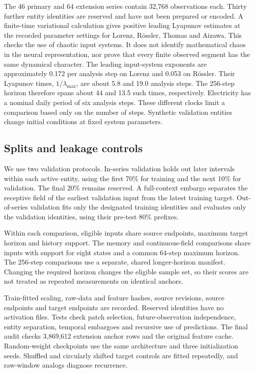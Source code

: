 \documentclass[10pt,a4paper,twocolumn]{article}
\begin{document}
The 46 primary and 64 extension series contain 32,768 observations each.
Thirty further entity identities are reserved and have not been prepared or encoded.
A finite-time variational calculation gives positive leading Lyapunov estimates at the recorded parameter settings for Lorenz, R\"ossler, Thomas and Aizawa.
This checks the use of chaotic input systems.
It does not identify mathematical chaos in the neural representation, nor prove that every finite observed segment has the same dynamical character.
The leading input-system exponents are approximately 0.172 per analysis step on Lorenz and 0.053 on R\"ossler.
Their Lyapunov times, $1/\lambda_{\max}$, are about 5.8 and 19.0 analysis steps.
The 256-step horizon therefore spans about 44 and 13.5 such times, respectively.
Electricity has a nominal daily period of six analysis steps.
These different clocks limit a comparison based only on the number of steps.
Synthetic validation entities change initial conditions at fixed system parameters.

\subsection{Splits and leakage controls}
We use two validation protocols.
In-series validation holds out later intervals within each active entity, using the first 70\% for training and the next 10\% for validation.
The final 20\% remains reserved.
A full-context embargo separates the receptive field of the earliest validation input from the latest training target.
Out-of-series validation fits only the designated training identities and evaluates only the validation identities, using their pre-test 80\% prefixes.

Within each comparison, eligible inputs share source endpoints, maximum target horizon and history support.
The memory and continuous-field comparisons share inputs with support for eight states and a common 64-step maximum horizon.
The 256-step comparisons use a separate, shared longer-horizon manifest.
Changing the required horizon changes the eligible sample set, so their scores are not treated as repeated measurements on identical anchors.

Train-fitted scaling, raw-data and feature hashes, source revisions, source endpoints and target endpoints are recorded.
Reserved identities have no activation files.
Tests check patch selection, future-observation independence, entity separation, temporal embargoes and recursive use of predictions.
The final audit checks 3,869,612 extension anchor rows and the original feature cache.
Random-weight checkpoints use the same architecture and three initialization seeds.
Shuffled and circularly shifted target controls are fitted repeatedly, and raw-window analogs diagnose recurrence.
\end{document}
